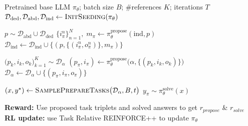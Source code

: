 \documentclass{article}
\begin{document}
\begin{algorithm}[t]
\caption{Self-Play Training of Absolute Zero Reasoner (AZR)}
\label{alg:azr-training}
\begin{algorithmic}[1]
\Require Pretrained base LLM $\pi_\theta$; batch size $B$; \#references $K$; iterations $T$
\State $\mathcal D_{\text{ded}},\mathcal D_{\text{abd}},\mathcal D_{\text{ind}} \gets \textsc{InitSeeding}(\pi_\theta)$ 

    
    \State $p \sim \mathcal D_{\text{abd}} \cup \mathcal D_{\text{ded}}$ 
    \State $\bigl\{i^n_\pi\bigr\}_{n=1}^{N},\;m_\pi \gets \pi_\theta^{\text{propose}}(\text{ind},p)$ 
     
        \State $\mathcal D_{\text{ind}} \gets \mathcal D_{\text{ind}} \cup \bigl\{(p,\{(i^n_\pi,o^n_\pi)\},m_\pi)\bigr\}$ 
    \EndIf

      \State $\bigl(p_k,i_k,o_k\bigr)_{k=1}^{K} \sim \mathcal D_{\alpha}$ 
      \State $(p_\pi,i_\pi) \gets \pi_\theta^{\text{propose}}\!\bigl(\alpha,\{(p_k,i_k,o_k)\}\bigr)$
       
        \State $\mathcal D_{\alpha} \gets \mathcal D_{\alpha} \cup \bigl\{(p_\pi,i_\pi,o_\pi)\bigr\}$ 
      \EndIf
    \EndFor
  \EndFor

   
    \State $(x,y^\star) \gets \textsc{SamplePrepareTasks}\bigl(\mathcal D_{\alpha},B,t\bigr)$
    \State $y_\pi \sim \pi_\theta^{\text{solve}}(x)$
  \EndFor

  \State \textbf{Reward:} Use proposed task triplets and solved answers to get $r_{propose}$ \& $r_{solve}$ 
  \State \textbf{RL update:} use Task Relative REINFORCE++ to update $\pi_\theta$ 
\EndFor
\end{algorithmic}
\end{algorithm}
\end{document}
